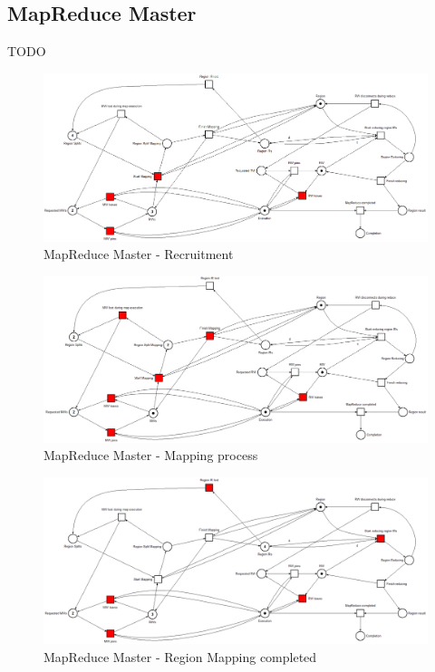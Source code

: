 \subsection{MapReduce Master}
TODO

\begin{figure}[!ht]
    \centering
    \includegraphics[width=\linewidth]{document/chapters/chapter_6/images/master_petri_net_1.png}
    \caption{MapReduce Master - Recruitment}
    \label{fig:master_petri_net_1}
\end{figure}

\begin{figure}[!ht]
    \centering
    \includegraphics[width=\linewidth]{document/chapters/chapter_6/images/master_petri_net_2.png}
    \caption{MapReduce Master - Mapping process}
    \label{fig:master_petri_net_2}
\end{figure}

\begin{figure}[!ht]
    \centering
    \includegraphics[width=\linewidth]{document/chapters/chapter_6/images/master_petri_net_3.png}
    \caption{MapReduce Master - Region Mapping completed}
    \label{fig:master_petri_net_3}
\end{figure}

